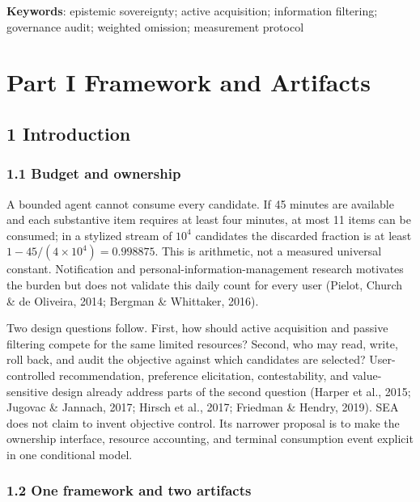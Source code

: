 \documentclass[
  11pt]{article}
\begin{document}
\textbf{Keywords}: epistemic sovereignty; active acquisition;
information filtering; governance audit; weighted omission; measurement
protocol

\newpage
\tableofcontents
\newpage

\section{Part I Framework and
Artifacts}\label{part-i-framework-and-artifacts}

\subsection{1 Introduction}\label{introduction}

\subsubsection{1.1 Budget and ownership}\label{budget-and-ownership}

A bounded agent cannot consume every candidate. If 45 minutes are
available and each substantive item requires at least four minutes, at
most 11 items can be consumed; in a stylized stream of \(10^4\)
candidates the discarded fraction is at least
\(1-45/(4\times10^4)=0.998875\). This is arithmetic, not a measured
universal constant. Notification and personal-information-management
research motivates the burden but does not validate this daily count for
every user (Pielot, Church \& de Oliveira, 2014; Bergman \& Whittaker,
2016).

Two design questions follow. First, how should active acquisition and
passive filtering compete for the same limited resources? Second, who
may read, write, roll back, and audit the objective against which
candidates are selected? User-controlled recommendation, preference
elicitation, contestability, and value-sensitive design already address
parts of the second question (Harper et al., 2015; Jugovac \& Jannach,
2017; Hirsch et al., 2017; Friedman \& Hendry, 2019). SEA does not claim
to invent objective control. Its narrower proposal is to make the
ownership interface, resource accounting, and terminal consumption event
explicit in one conditional model.

\subsubsection{1.2 One framework and two
artifacts}\label{one-framework-and-two-artifacts}
\end{document}
